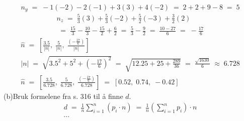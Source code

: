\documentclass[12pt, a4paper]{article}
\begin{document}
			\begin{equation}
				\tag*{}
					n_y\;=\;-1(-2)-2(-1)+3(3)+4(-2)\;=\;
					2+2+9-8\;=\;5
			\end{equation}
			\begin{gather}
				\tag*{}
					n_z\;=\;\frac{5}{3}(3)+\frac{5}{3}(-2)
					+\frac{5}{2}(-3)+\frac{3}{2}(2)\\
				\tag*{}
					\;=\;\frac{15}{3}-\frac{10}{3}
					-\frac{15}{2}+\frac{6}{2}\;=\;
					\frac{5}{3}-\frac{9}{2}\;=\;
					\frac{10-27}{6}\;=\;-\frac{17}{6}
			\end{gather}
			\begin{gather}
				\tag*{}
					\hat{n}\;=\;\left[
						\frac{3.5}{|n|},\;
						\frac{5}{|n|},\;
						\frac{\left(-\frac{17}{6}\right)}{|n|}
					\right]\\
				\tag*{}
					|n|\;=\;\sqrt{
						3.5^2+5^2+\left(-\frac{17}{6}\right)^2
					}\;=\;\sqrt{12.25+25+\frac{289}{36}}
					\;=\;\frac{\sqrt{1630}}{6}
					\;\approx\;6.728\\
				\tag*{}
					\hat{n}\;=\;\left[
							\frac{3.5}{6.728},\;
							\frac{5}{6.728},\;
							\frac{\left(-\frac{17}{6}\right)}
							{6.728}					
					\right]\;=\;\left[
						0.52,\;0.74,\;-0.42
					\right]
			\end{gather}
\newpage
	\begin{equation}
		\tag*{}
	\end{equation}
	(b)\quad Bruk formelene fra s. 316 til å finne $d$.
			\begin{gather}
				\tag*{}
					d\;=\;\frac{1}{n}\sum_{i=1}^{n}\left(
						p_i \cdot n
					\right)\;=\;\frac{1}{n}\left(
						\sum_{i=1}^{n}p_i
					\right)\cdot n\\
				\tag*{}
					\cdots
			\end{gather}
\end{document}
